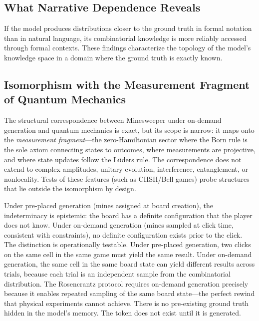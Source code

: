 \documentclass[12pt,a4paper]{article}
\begin{document}
\subsection{What Narrative Dependence Reveals}
\label{sec:narrative_reveals}

If the model produces distributions closer to the ground truth in formal notation than in natural language, its combinatorial knowledge is more reliably accessed through formal contexts. These findings characterize the topology of the model's knowledge space in a domain where the ground truth is exactly known.

\subsection{Isomorphism with the Measurement Fragment of Quantum Mechanics}
\label{sec:quantum_framing}

The structural correspondence between Minesweeper under on-demand generation and quantum mechanics is exact, but its scope is narrow: it maps onto the \emph{measurement fragment}---the zero-Hamiltonian sector where the Born rule is the sole axiom connecting states to outcomes, where measurements are projective, and where state updates follow the L\"uders rule. The correspondence does not extend to complex amplitudes, unitary evolution, interference, entanglement, or nonlocality. Tests of these features (such as CHSH/Bell games) probe structures that lie outside the isomorphism by design.

Under pre-placed generation (mines assigned at board creation), the indeterminacy is epistemic: the board has a definite configuration that the player does not know. Under on-demand generation (mines sampled at click time, consistent with constraints), no definite configuration exists prior to the click. The distinction is operationally testable. Under pre-placed generation, two clicks on the same cell in the same game must yield the same result. Under on-demand generation, the same cell in the same board state can yield different results across trials, because each trial is an independent sample from the combinatorial distribution. The Rosencrantz protocol requires on-demand generation precisely because it enables repeated sampling of the same board state---the perfect rewind that physical experiments cannot achieve. There is no pre-existing ground truth hidden in the model's memory. The token does not exist until it is generated.
\end{document}

